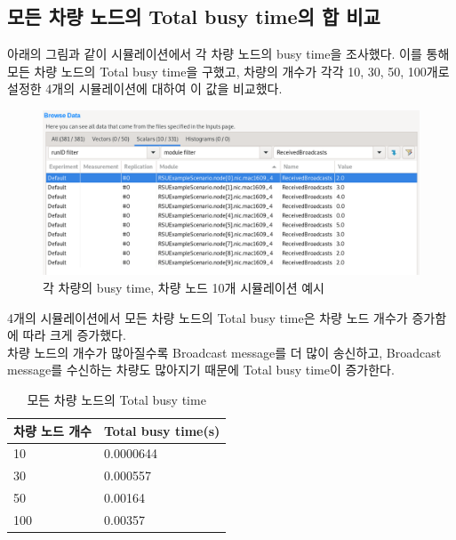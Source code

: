 \newpage
\subsection*{모든 차량 노드의 Total busy time의 합 비교}
    아래의 그림과 같이 시뮬레이션에서 각 차량 노드의 busy time을 조사했다. 이를 통해 모든 차량 노드의 Total busy time을 구했고, 차량의 개수가 각각 10, 30, 50, 100개로 설정한 4개의 시뮬레이션에 대하여 이 값을 비교했다.
    \vspace{-3mm}
    \begin{figure}[!h]\centering 
        \includegraphics[width=.80\textwidth]{image/week14/2-6.png}
        \caption{\footnotesize
        각 차량의 busy time, 차량 노드 10개 시뮬레이션 예시}
        \vspace{-10pt}
    \end{figure}
    
    4개의 시뮬레이션에서 모든 차량 노드의 Total busy time은 차량 노드 개수가 증가함에 따라 크게 증가했다. \\
    차량 노드의 개수가 많아질수록 Broadcast message를 더 많이 송신하고, Broadcast message를 수신하는 차량도 많아지기 때문에 Total busy time이 증가한다.
    \vspace{-3mm}
    \begin{table}[h!]
    \centering
        \begin{tabular}{|l|l|}
        \hline
        \textbf{차량 노드 개수} & \textbf{Total busy time(s)} \\
        \hline
        10 & 0.0000644 \\
        \hline
        30 & 0.000557 \\
        \hline
        50 & 0.00164 \\
        \hline
        100 & 0.00357 \\
        \hline
        \end{tabular}
        \caption{모든 차량 노드의 Total busy time}
    \end{table}
    \vspace{-3mm}

    